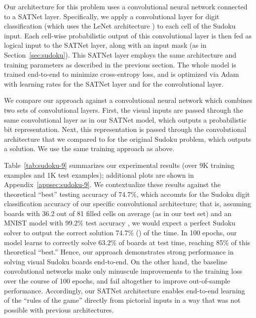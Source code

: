 \documentclass{article}
\begin{document}
	Our architecture for this problem uses a convolutional neural network connected to a SATNet layer. 
	Specifically, we apply a convolutional layer for digit classification (which uses the LeNet architecture \cite{lecun1998gradient}) to each cell of the Sudoku input.
	Each cell-wise probabilistic output of this convolutional layer is then fed as logical input to the SATNet layer, along with an input mask (as in Section~\ref{sec:sudoku}).
	This SATNet layer employs the same architecture and training parameters as described in the previous section.
	The whole model is trained end-to-end to minimize cross-entropy loss, and is optimized via Adam with learning rates  for the SATNet layer and  for the convolutional layer. 
	
	We compare our approach against a convolutional neural network which combines two sets of convolutional layers. First, the visual inputs are passed through the same convolutional layer as in our SATNet model, which outputs a probabilistic bit representation. Next, this representation is passed through the convolutional architecture that we compared to for the original Sudoku problem, which outputs a solution. We use the same training approach as above. 
	
	Table~\ref{tab:sudoku-9} summarizes our experimental results (over 9K training examples and 1K test examples); additional plots are shown in Appendix~\ref{appsec:sudoku-9}.
	We contextualize these results against the theoretical ``best'' testing accuracy of 74.7\%, which accounts for the Sudoku digit classification accuracy of our specific convolutional architecture;
	that is, assuming boards with 36.2 out of 81 filled cells on average (as in our test set) and 
an
	MNIST model with 99.2\% test accuracy \cite{lecun1998gradient}, we would expect a perfect Sudoku solver to output the correct solution 74.7\% () of the time.
	In 100 epochs, our model learns to correctly solve 63.2\% of boards at test time, reaching 85\% of this theoretical ``best.''
	Hence, our approach demonstrates strong performance in solving visual Sudoku boards end-to-end.
	On the other hand, the baseline convolutional networks make only minuscule improvements to the training loss over the course of 100 epochs, and fail altogether to improve out-of-sample performance.
	Accordingly, our SATNet architecture enables end-to-end learning of the ``rules of the game'' directly from pictorial inputs in a way that was not possible with previous architectures.
	
	
\end{document}
